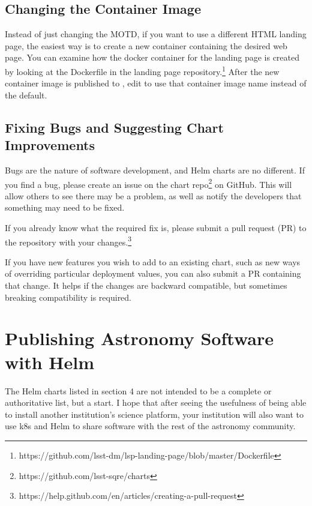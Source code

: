\documentclass[11pt,twoside]{article}
\begin{document}
\subsection{Changing the Container Image}

Instead of just changing the MOTD, if you want to use a different HTML landing page,
the easiest way is to create a new container containing the desired web page.  You can
examine how the docker container for the landing page is created by looking at the
Dockerfile in the landing page repository.\footnote{
https://github.com/lsst-dm/lsp-landing-page/blob/master/Dockerfile}
After the new container image is published to , edit
 to use that container image name instead of the default.

\subsection{Fixing Bugs and Suggesting Chart Improvements}

Bugs are the nature of software development, and Helm charts are no different.  If you
find a bug, please create an issue on the chart repo\footnote{https://github.com/lsst-sqre/charts}
on GitHub.  This will allow others to see there may be a problem, as well as notify the
developers that something may need to be fixed.

If you already know what the required fix is, please submit a pull request (PR)
to the repository with your changes.\footnote{
https://help.github.com/en/articles/creating-a-pull-request}

If you have new features you wish to add to an existing chart, such as new ways of overriding
particular deployment values, you can also submit a PR containing that change.  It helps
if the changes are backward compatible, but sometimes breaking compatibility is required.

\section{Publishing Astronomy Software with Helm}

The Helm charts listed in section 4 are not intended to be a complete or authoritative
list, but a start.  I hope that after seeing the usefulness of being able
to install another institution's science platform, your institution will also want to
use k8s and Helm to share software with the rest of the astronomy community.
\end{document}
